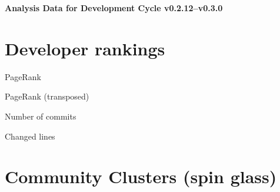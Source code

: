 \documentclass{article}
\begin{document}
\setlength{\parindent}{0pt}
\begin{center}
\begin{Large}
\textbf{Analysis Data for Development Cycle v0.2.12--v0.3.0}
\end{Large}
\end{center}
\section{Developer rankings}
\begin{small}\renewcommand{\tabcolsep}{1pt}
\begin{minipage}{0.5\linewidth}
PageRank\\

\end{minipage}%
\begin{minipage}{0.5\linewidth}
PageRank (transposed)\\

\end{minipage}

\renewcommand{\tabcolsep}{5pt}
\begin{minipage}{0.5\linewidth}
Number of commits\\

\end{minipage}%
\begin{minipage}{0.5\linewidth}
Changed lines\\

\end{minipage}
\end{small}
\newpage\section{Community Clusters (spin glass)}
\end{document}
